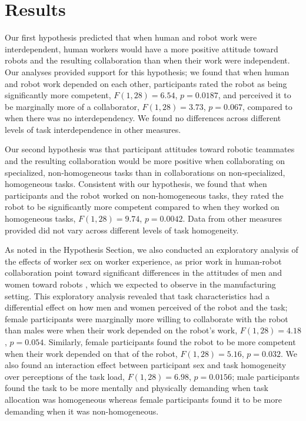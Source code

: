 \section{Results}
Our first hypothesis predicted that when human and robot work were interdependent, human workers would have a more positive attitude toward robots and the resulting collaboration than when their work were independent. Our analyses provided support for this hypothesis; we found that when human and robot work depended on each other, participants rated the robot as being significantly more competent, $F(1, 28) = 6.54$, $p = 0.0187$, and perceived it to be marginally more of a collaborator, $F(1, 28) = 3.73$, $p = 0.067$, compared to when there was no interdependency. We found no differences across different levels of task interdependence in other measures.

Our second hypothesis was that participant attitudes toward robotic teammates and the resulting collaboration would be more positive when collaborating on specialized, non-homogeneous tasks than in collaborations on non-specialized, homogeneous tasks. Consistent with our hypothesis, we found that when participants and the robot worked on non-homogeneous tasks, they rated the robot to be significantly more competent compared to when they worked on homogeneous tasks, $F(1, 28) = 9.74$, $p = 0.0042$. Data from other measures provided did not vary across different levels of task homogeneity.

As noted in the Hypothesis Section, we also conducted an exploratory analysis of the effects of worker sex on worker experience, as prior work in human-robot collaboration point toward significant differences in the attitudes of men and women toward robots \cite{mutlu2006task,mutlu2006storytelling,schermerhorn2008robot,takayama2009influences}, which we expected to observe in the manufacturing setting. This exploratory analysis revealed that task characteristics had a differential effect on how men and women perceived of the robot and the task; female participants were marginally more willing to collaborate with the robot than males were when their work depended on the robot's work, $F(1,28) = 4.18$, $p = 0.054$. Similarly, female participants found the robot to be more competent when their work depended on that of the robot, $F(1,28) = 5.16$, $p = 0.032$. We also found an interaction effect between participant sex and task homogeneity over perceptions of the task load, $F(1,28) = 6.98$, $p = 0.0156$; male participants found the task to be more mentally and physically demanding when task allocation was homogeneous whereas female participants found it to be more demanding when it was non-homogeneous.

